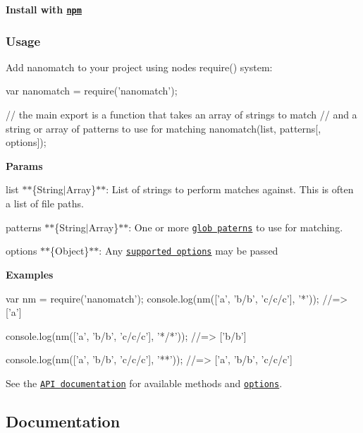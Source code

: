 {\bfseries Install with \href{https://npmjs.com}{\tt npm}}




\subsubsection*{Usage}

Add nanomatch to your project using node\textquotesingle{}s {\ttfamily require()} system\+:


\begin{DoxyCode}
var nanomatch = require('nanomatch');

// the main export is a function that takes an array of strings to match
// and a string or array of patterns to use for matching
nanomatch(list, patterns[, options]);
\end{DoxyCode}


{\bfseries Params}


\begin{DoxyItemize}
\item {\ttfamily list} $\ast$$\ast$\{String$\vert$\+Array\}$\ast$$\ast$\+: List of strings to perform matches against. This is often a list of file paths.
\item {\ttfamily patterns} $\ast$$\ast$\{String$\vert$\+Array\}$\ast$$\ast$\+: One or more \href{#features}{\tt glob paterns} to use for matching.
\item {\ttfamily options} $\ast$$\ast$\{Object\}$\ast$$\ast$\+: Any \href{#options}{\tt supported options} may be passed
\end{DoxyItemize}

{\bfseries Examples}


\begin{DoxyCode}
var nm = require('nanomatch');
console.log(nm(['a', 'b/b', 'c/c/c'], '*'));
//=> ['a']

console.log(nm(['a', 'b/b', 'c/c/c'], '*/*'));
//=> ['b/b']

console.log(nm(['a', 'b/b', 'c/c/c'], '**'));
//=> ['a', 'b/b', 'c/c/c']
\end{DoxyCode}


See the \href{#api}{\tt A\+PI documentation} for available methods and \href{https://github.com/einaros/options.js}{\tt options}.

\subsection*{Documentation}

